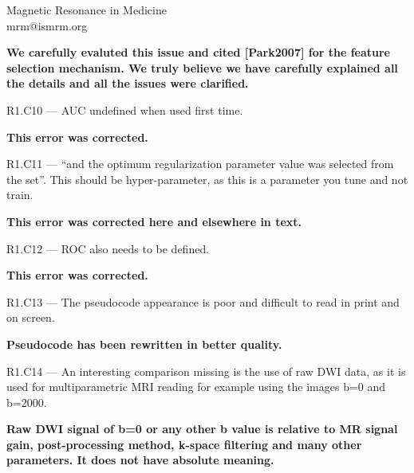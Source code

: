 \documentclass{letter}
\newenvironment{comment}[1]%
  {\vspace{5ex}\par\textsf{#1 ---} \ignorespaces}%
  {\par\ignorespacesafterend}
\newenvironment{reply}%
  {\vspace{2ex}\par\bfseries}%
  {\par\upshape}
\providecommand{\citet}[1]{[#1]}
\begin{document}
\begin{letter}{Magnetic Resonance in Medicine \\ mrm@ismrm.org}
\begin{reply}
We carefully evaluted this issue and cited \citet{Park2007} for the feature
selection mechanism. We truly believe we have carefully explained all the
details and all the issues were clarified.
\end{reply}


\begin{comment}{R1.C10}
AUC undefined when used first time.
\end{comment}

\begin{reply}
This error was corrected.
\end{reply}


\begin{comment}{R1.C11}
“and the optimum regularization parameter value was selected from the set”.
This should be hyper-parameter, as this is a parameter you tune and not train.
\end{comment}

\begin{reply}
This error was corrected here and elsewhere in text.
\end{reply}


\begin{comment}{R1.C12}
ROC also needs to be defined.
\end{comment}

\begin{reply}
This error was corrected.
\end{reply}


\begin{comment}{R1.C13}
The pseudocode appearance is poor and difficult to read in print and on screen.
\end{comment}

\begin{reply}
Pseudocode has been rewritten in better quality.
\end{reply}


\begin{comment}{R1.C14}
An interesting comparison missing is the use of raw DWI data, as it is used for
multiparametric MRI reading for example using the images b=0 and b=2000.
\end{comment}

\begin{reply}
Raw DWI signal of b=0 or any other b value is relative to MR signal gain,
post-processing method, k-space filtering and many other parameters. It does not
have absolute meaning.
\end{reply}



\end{letter}
\end{document}
